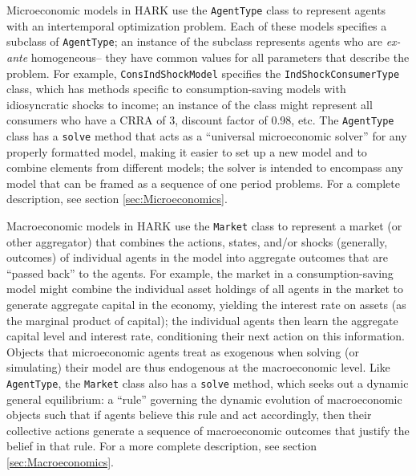 \documentclass[12pt,titlepage,letterpaper]{econtex}
\begin{document}
{Microeconomic models in HARK use the \texttt{AgentType} class to represent agents with an intertemporal optimization problem.  Each of these models specifies a subclass of \texttt{AgentType}; an instance of the subclass represents agents who are \textit{ex-ante} homogeneous-- they have common values for all parameters that describe the problem.  For example, \texttt{ConsIndShockModel} specifies the \texttt{IndShockConsumerType} class, which has methods specific to consumption-saving models with idiosyncratic shocks to income; an instance of the class might represent all consumers who have a CRRA of 3, discount factor of 0.98, etc.  The \texttt{AgentType} class has a \texttt{solve} method that acts as a ``universal microeconomic solver'' for any properly formatted model, making it easier to set up a new model and to combine elements from different models; the solver is intended to encompass any model that can be framed as a sequence of one period problems.  For a complete description, see section \ref{sec:Microeconomics}.

Macroeconomic models in HARK use the \texttt{Market} class to represent a market (or other aggregator) that combines the actions, states, and/or shocks (generally, outcomes) of individual agents in the model into aggregate outcomes that are ``passed back'' to the agents.  For example, the market in a consumption-saving model might combine the individual asset holdings of all agents in the market to generate aggregate capital in the economy, yielding the interest rate on assets (as the marginal product of capital); the individual agents then learn the aggregate capital level and interest rate, conditioning their next action on this information.  Objects that microeconomic agents treat as exogenous when solving (or simulating) their model are thus endogenous at the macroeconomic level. Like \texttt{AgentType}, the \texttt{Market} class also has a \texttt{solve} method, which seeks out a dynamic general equilibrium: a ``rule'' governing the dynamic evolution of macroeconomic objects such that if agents believe this rule and act accordingly, then their collective actions generate a sequence of macroeconomic outcomes that justify the belief in that rule.  For a more complete description, see section \ref{sec:Macroeconomics}.

}
\end{document}
